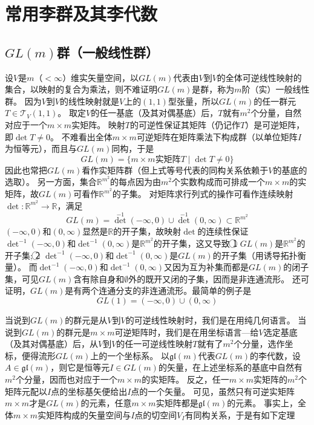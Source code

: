 \section{常用李群及其李代数}

\subsection{$GL(m)$群（一般线性群）}

设$V$是$m$（$< \infty$）维实矢量空间，以$GL(m)$代表由$V$到$V$的全体可逆线性映射的集合，以映射的复合为乘法，则不难证明$GL(m)$是群，称为$m$阶（实）一般线性群。
因为$V$到$V$的线性映射就是$V$上的$(1, 1)$型张量，所以$GL(m)$的任一群元$T \in \mathscr{T}_V(1, 1)$。
取定$V$的任一基底（及其对偶基底）后，$T$就有$m^2$个分量，自然对应于一个$m \times m$实矩阵。
映射$T$的可逆性保证其矩阵（仍记作$T$）是可逆矩阵，即$\det T \neq 0$。
不难看出全体$m \times m$可逆矩阵在矩阵乘法下构成群（以单位矩阵$I$为恒等元），而且与$GL(m)$同构，于是
$$GL(m) = \{m \times m\text{实矩阵}T \mid \det T \neq 0\}$$
因此也常把$GL(m)$看作实矩阵群（但上式等号代表的同构关系依赖于$V$的基底的选取）。
另一方面，集合$\mathbb{R}^{m^2}$的每点因为由$m^2$个实数构成而可排成一个$m \times m$的实矩阵，故$GL(m)$可看作$\mathbb{R}^{m^2}$的子集。
对矩阵求行列式的操作可看作连续映射$\det \colon \mathbb{R}^{m^2} \to \mathbb{R}$，满足
$$\textstyle GL(m) = \det^{-1}(-\infty, 0) \cup \det^{-1}(0, \infty) \subset \mathbb{R}^{m^2}$$
$(-\infty, 0)$和$(0, \infty)$显然是$\mathbb{R}$的开子集，故映射$\det$的连续性保证$\det^{-1}(-\infty, 0)$和$\det^{-1}(0, \infty)$是$\mathbb{R}^{m^2}$的开子集，这又导致
\textcircled{1} $GL(m)$是$\mathbb{R}^{m^2}$的开子集;
\textcircled{2} $\det^{-1}(-\infty, 0)$和$\det^{-1}(0, \infty)$是$GL(m)$的开子集（用诱导拓扑衡量）。
而$\det^{-1}(-\infty, 0)$和$\det^{-1}(0, \infty)$又因为互为补集而都是$GL(m)$的闭子集，可见$GL(m)$含有除自身和$\emptyset$外的既开又闭的子集，因而是非连通流形。
还可证明，$GL(m)$是有两个连通分支的非连通流形。最简单的例子是
$$GL(1) = (-\infty, 0) \cup (0, \infty) $$

当说到$GL(m)$的群元是从$V$到$V$的可逆线性映射时，我们是在用纯几何语言。
当说到$GL(m)$的群元是$m \times m$可逆矩阵时，我们是在用坐标语言---给$V$选定基底（及其对偶基底）后，从$V$到$V$的任一可逆线性映射$T$就有了$m^2$个分量，选作坐标，便得流形$GL(m)$上的一个坐标系。
以$\mathfrak{gl}(m)$代表$GL(m)$的李代数，设$A \in \mathfrak{gl}(m)$，则它是恒等元$I \in GL(m)$的矢量，在上述坐标系的基底中自然有$m^2$个分量，因而也对应于一个$m \times m$的实矩阵。
反之，任一$m \times m$实矩阵的$m^2$个矩阵元配以$I$点的坐标基矢便给出$I$点的一个矢量。
可见，虽然只有可逆实矩阵$m \times m$才是$GL(m)$的元素，任意$m \times m$实矩阵都是$\mathfrak{gl}(m)$的元素。
事实上，全体$m \times m$实矩阵构成的矢量空间与$I$点的切空间$V_I$有同构关系，于是有如下定理

